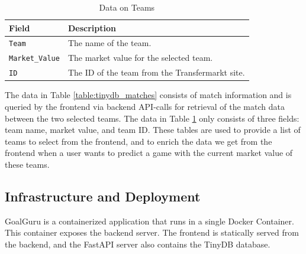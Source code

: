 \documentclass[conference,a4paper,flushend]{cs-techrep}
\begin{document}
\begin{table}[h!]
\centering
\caption{Data on Teams}
\label{table:tinydb_teams}
\begin{tabular}{l|l}
\rowcolor{lightgray}
\textbf{Field} & \textbf{Description} \\
\hline
\verb|Team| & The name of the team. \\
\verb|Market_Value| & The market value for the selected team. \\
\verb|ID| & The ID of the team from the Transfermarkt site. \\
\end{tabular}
\end{table}

The data in Table \ref{table:tinydb_matches} consists of match information and is queried by the frontend via backend API-calls for retrieval of the match data between the two selected teams. The data in Table \ref{table:tinydb_teams} only consists of three fields: team name, market value, and team ID. These tables are used to provide a list of teams to select from the frontend, and to enrich the data we get from the frontend when a user wants to predict a game with the current market value of these teams.



\subsection{Infrastructure and Deployment} \label{section_deployment}

GoalGuru is a containerized application that runs in a single Docker \cite{docker} Container. This container exposes the backend server. The frontend is statically served from the backend, and the FastAPI server also contains the TinyDB database.
\end{document}
